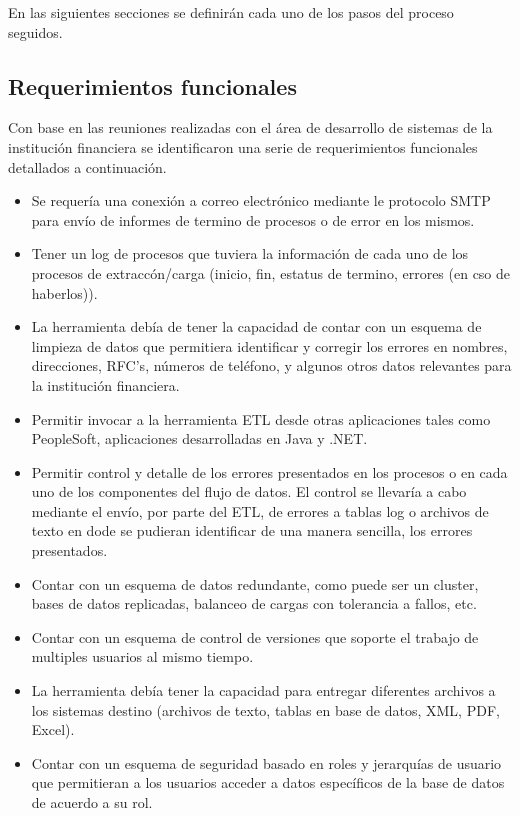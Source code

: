 \documentclass[a4paper,openright,12pt]{book}
\begin{document}
En las siguientes secciones se definir\'an cada uno de los pasos del proceso seguidos.

\subsection{Requerimientos funcionales}

Con base en las reuniones realizadas con el \'area de desarrollo de sistemas de la instituci\'on financiera se identificaron una serie de requerimientos funcionales detallados a continuaci\'on. 

\begin{itemize}
\item Se requer\'ia una conexi\'on a correo electr\'onico mediante le protocolo SMTP para env\'io de informes de termino de procesos o de error en los mismos.
\item Tener un log de procesos que tuviera la informaci\'on de cada uno de los procesos de extracc\'on/carga  (inicio, fin, estatus de termino, errores (en cso de haberlos)).
\item La herramienta deb\'ia de tener la capacidad de contar con un esquema de limpieza de datos que permitiera identificar y corregir los errores en nombres, direcciones, RFC's, n\'umeros de tel\'efono, y algunos otros datos relevantes para la instituci\'on financiera.
\item Permitir invocar a la herramienta ETL desde otras aplicaciones tales como PeopleSoft, aplicaciones desarrolladas en Java y .NET.
\item Permitir control y detalle de los errores presentados en los procesos o en cada uno de los componentes del flujo de datos. El control se llevaría a cabo mediante el env\'io, por parte del ETL, de errores a tablas log o archivos de texto en dode se pudieran identificar de una manera sencilla, los errores presentados.
\item Contar con un esquema de datos redundante, como puede ser un cluster, bases de datos replicadas, balanceo de cargas con tolerancia a fallos, etc.
\item Contar con un esquema de control de versiones que soporte el trabajo de multiples usuarios al mismo tiempo.
\item La herramienta deb\'ia tener la capacidad para entregar diferentes archivos a los sistemas destino (archivos de texto, tablas en base de datos, XML, PDF, Excel).
\item Contar con un esquema de seguridad basado en roles y jerarqu\'ias de usuario que permitieran a los usuarios acceder a datos espec\'ificos de la base de datos de acuerdo a su rol.

\end{itemize}
\end{document}
